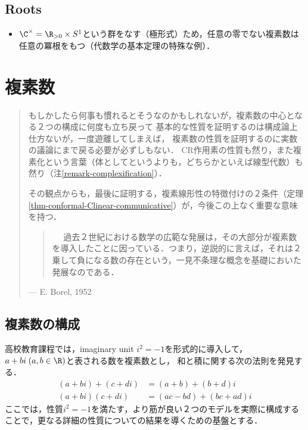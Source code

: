 \documentclass[uplatex, dvipdfmx]{jsreport}
\begin{document}
\section{Roots}

\begin{itemize}
    \item $\C^\times=\R_{>0}\times S^1$という群をなす（極形式）ため，任意の零でない複素数は任意の冪根をもつ（代数学の基本定理の特殊な例）．
\end{itemize}

\chapter{複素数}

\begin{quotation}
    もしかしたら何事も慣れるとそうなのかもしれないが，複素数の中心となる２つの構成に何度も立ち戻って
    基本的な性質を証明するのは構成論上仕方ないが，一度遊離してしまえば，
    複素数の性質を証明するのに実数の議論にまで戻る必要が必ずしもない．
    CR作用素の性質も然り，また複素化という言葉（体としてというよりも，どちらかといえば線型代数）も然り（注\ref{remark-complexification}）．

    その観点からも，最後に証明する，複素線形性の特徴付けの２条件（定理\ref{thm-conformal-Clinear-communicative}）が，今後この上なく重要な意味を持つ．
    \begin{quote}
　      過去２世紀における数学の広範な発展は，その大部分が複素数を導入したことに因っている．つまり，逆説的に言えば，それは２乗して負になる数の存在という，一見不条理な概念を基礎においた発展なのである．\cite{Elias Stein}
    \end{quote}
    \begin{flushright}
        --- E. Borel, 1952
    \end{flushright}
\end{quotation}

\section{複素数の構成}

\begin{screen}
    高校教育課程では，imaginary unit $i^2=-1$を形式的に導入して，$a+bi\;(a,b\in\R)$と表される数を複素数とし，
    和と積に関する次の法則を発見する．
    \begin{align}
        (a+bi) + (c+di) &= (a+b) + (b+d)i\\
        (a+bi)(c+di) &= (ac-bd) + (bc+ad)i
    \end{align}
    ここでは，性質$i^2=-1$を満たす，より筋が良い２つのモデルを実際に構成することで，更なる詳細の性質についての結果を導くための基盤とする．
\end{screen}
\end{document}
